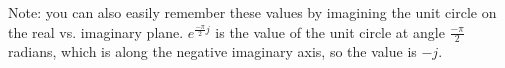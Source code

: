 \documentclass[11pt]{article}
\begin{document}
Note: you can also easily remember these values by imagining the unit circle on the real vs. imaginary plane. $e^{\frac{-\pi}{2} j}$ is the value of the unit circle at angle $\frac{-\pi}{2}$ radians, which is along the negative imaginary axis, so the value is $-j$.

%
%
\end{document}
